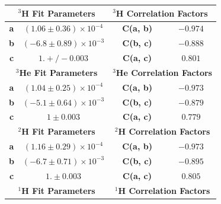\documentclass[review,numbers,sort&compress]{elsarticle}
\begin{document}
\begin{table}[!h]
\begin{tabular}{|c|c|l|c|c|l|}
\hline
\multicolumn{3}{|c|}{\textbf{$^{3}$H Fit Parameters}}                                & \multicolumn{3}{l|}{\textbf{$^{3}$H Correlation Factors}}    \\ \hline
\textbf{a}              & \multicolumn{2}{c|}{$(1.06 \pm 0.36) \times 10^{-4}$}                & \textbf{C(a, b)}             & \multicolumn{2}{c|}{$-0.974$} \\ \hline
\textbf{b}              & \multicolumn{2}{c|}{$(-6.8 \pm 0.89) \times 10^{-3}$}                 & \textbf{C(b, c)}             & \multicolumn{2}{c|}{$-0.888$} \\ \hline
\textbf{c}              & \multicolumn{2}{c|}{$1. +/- 0.003$}                        & \textbf{C(a, c)}             & \multicolumn{2}{c|}{$0.801$}  \\ \hline
\multicolumn{3}{|c|}{\textbf{$^{3}$He Fit Parameters}}                               & \multicolumn{3}{c|}{\textbf{$^{3}$He Correlation Factors}}   \\ \hline
\textbf{a}              & \multicolumn{2}{c|}{$(1.04 \pm 0.25) \times 10^{-4}$}                 & \textbf{C(a, b)}                      & \multicolumn{2}{c|}{$-0.973$} \\ \hline
\textbf{b}              & \multicolumn{2}{c|}{$(-5.1 \pm 0.64) \times 10^{-3}$}                 & \textbf{C(b, c)}                      & \multicolumn{2}{c|}{$-0.879$} \\ \hline
\textbf{c}              & \multicolumn{2}{c|}{$1 \pm 0.003$}                         & \textbf{C(a, c)}                     & \multicolumn{2}{c|}{$0.779$}  \\ \hline
\multicolumn{3}{|c|}{\textbf{$^{2}$H Fit Parameters}}                                & \multicolumn{3}{c|}{\textbf{$^{2}$H Correlation Factors}}    \\ \hline
\textbf{a}              & \multicolumn{2}{c|}{$(1.16 \pm 0.29) \times 10^{-4}$} & \textbf{C(a, b)}             & \multicolumn{2}{c|}{$-0.973$} \\ \hline
\textbf{b}              & \multicolumn{2}{c|}{$(-6.7 \pm 0.71) \times 10^{-3}$}                 & \textbf{C(b, c)}             & \multicolumn{2}{c|}{$-0.895$} \\ \hline
\textbf{c}              & \multicolumn{2}{c|}{$1. \pm 0.003$}                        & \textbf{C(a, c)}             & \multicolumn{2}{c|}{$0.805$}  \\ \hline
\multicolumn{3}{|c|}{\textbf{$^{1}$H Fit Parameters}}                                & \multicolumn{3}{c|}{\textbf{$^{1}$H Correlation Factors}}    \\ \hline

\end{tabular}
\end{table}
\end{document}
